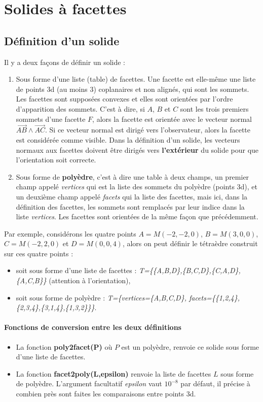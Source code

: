 \section{Solides à facettes}

\subsection{Définition d'un solide}

Il y a deux façons de définir un solide :
\begin{enumerate}
    \item Sous forme d'une liste (table) de facettes. Une facette est elle-même une liste de points 3d (au moins 3) coplanaires et non alignés, qui sont les sommets. Les facettes sont supposées convexes et elles sont orientées par l'ordre d'apparition des sommets. C'est à dire, si $A$, $B$ et $C$ sont les trois premiers sommets d'une facette $F$, alors la facette est orientée avec le vecteur normal $\vec{AB}\wedge\vec{AC}$. Si ce vecteur normal est dirigé vers l'observateur, alors la facette est considérée comme visible. Dans la définition d'un solide, les vecteurs normaux aux facettes doivent être dirigés vers \textbf{l'extérieur} du solide pour que l'orientation soit correcte.
    
    \item Sous forme de \textbf{polyèdre}, c'est à dire une table à deux champs, un premier champ appelé \emph{vertices} qui est la liste des sommets du polyèdre (points 3d), et un deuxième champ appelé \emph{facets} qui la liste des facettes, mais ici, dans la définition des facettes, les sommets sont remplacés par leur indice dans la liste \emph{vertices}. Les facettes sont orientées de la même façon que précédemment.
\end{enumerate}

Par exemple, considérons les quatre points $A=M(-2,-2,0)$, $B=M(3,0,0)$, $C=M(-2,2,0)$ et $D=M(0,0,4)$, alors on peut définir le tétraèdre construit sur ces quatre points :
\begin{itemize}
    \item soit sous forme d'une liste de facettes : \emph{T=\{\{A,B,D\},\{B,C,D\},\{C,A,D\},\{A,C,B\}\}} (attention à l'orientation),
    \item soit sous forme de polyèdre : 
    \emph{T=\{vertices=\{A,B,C,D\}, facets=\{\{1,2,4\},\{2,3,4\},\{3,1,4\},\{1,3,2\}\}\}}.
\end{itemize}

\paragraph{Fonctions de conversion entre les deux définitions}
\begin{itemize}
    \item La fonction \textbf{poly2facet(P)} où $P$ est un polyèdre, renvoie ce solide sous forme d'une liste de facettes.
    \item La fonction \textbf{facet2poly(L,epsilon)} renvoie la liste de facettes $L$ sous forme de polyèdre. L'argument facultatif \emph{epsilon} vaut $10^{-8}$ par défaut, il précise à combien près sont faites les comparaisons entre points 3d.
\end{itemize}

